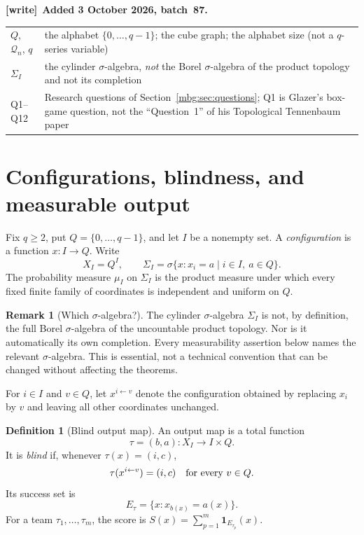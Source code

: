 \documentclass[11pt,letterpaper]{article}
\theoremstyle{definition}
\newtheorem{definition}[theorem]{Definition}
\newtheorem{remark}[theorem]{Remark}
\newcommand{\ind}{\mathbf 1}
\newcommand{\Sig}{\Sigma}
\newcommand{\sg}{\sigma}
\newcommand{\qset}{\{0,\ldots,q-1\}}
\newenvironment{writenote}[1][]{\par\smallskip\begingroup\small
 \noindent\textbf{[write]}\if\relax\detokenize{#1}\relax\else~\textbf{#1.}\fi\ }%
 {\par\endgroup\smallskip}
\begin{document}
\begin{writenote}[Added 3 October 2026, batch~87]
\begin{center}
\begin{tabular}{>{\raggedright\arraybackslash}p{}>{\raggedright\arraybackslash}p{}}
$Q$, $\mathcal Q_n$, $q$ & the alphabet $\{0,\ldots,q-1\}$; the cube graph; the alphabet size (not a $q$-series variable)\\
$\Sig_I$ & the cylinder $\sigma$-algebra, \emph{not} the Borel $\sigma$-algebra of the product topology and not its completion\\
Q1--Q12 & Research questions of Section~\ref{mbg:sec:questions}; Q1 is Glazer's box-game question, not the ``Question~1'' of his Topological Tennenbaum paper\\
\bottomrule
\end{tabular}
\end{center}
\end{writenote}

\section{Configurations, blindness, and measurable output}
\label{mbg:sec:model}

Fix $q\ge2$, put $Q=\qset$, and let $I$ be a nonempty set. A \emph{configuration} is a function $x:I\to Q$. Write
\[
 X_I=Q^I,\qquad
 \Sig_I=\sg\{x:x_i=a\mid i\in I,\ a\in Q\}.
\]
The probability measure $\mu_I$ on $\Sig_I$ is the product measure under which every fixed finite family of coordinates is independent and uniform on $Q$.

\begin{remark}[Which $\sigma$-algebra?]
The cylinder $\sigma$-algebra $\Sig_I$ is not, by definition, the full Borel $\sigma$-algebra of the uncountable product topology. Nor is it automatically its own completion. Every measurability assertion below names the relevant $\sigma$-algebra. This is essential, not a technical convention that can be changed without affecting the theorems.
\end{remark}

For $i\in I$ and $v\in Q$, let $x^{i\leftarrow v}$ denote the configuration obtained by replacing $x_i$ by $v$ and leaving all other coordinates unchanged.

\begin{definition}[Blind output map]
An output map is a total function
\[
 \tau=(b,a):X_I\longrightarrow I\times Q.
\]
It is \emph{blind} if, whenever $\tau(x)=(i,c)$,
\begin{equation}
 \tau(x^{i\leftarrow v})=(i,c)\quad\hbox{for every }v\in Q.
 \label{mbg:eq:blind}
\end{equation}
Its success set is
\[
 E_\tau=\{x:x_{b(x)}=a(x)\}.
\]
For a team $\tau_1,\ldots,\tau_m$, the score is
$S(x)=\sum_{p=1}^m\ind_{E_{\tau_p}}(x)$.
\end{definition}
\end{document}
